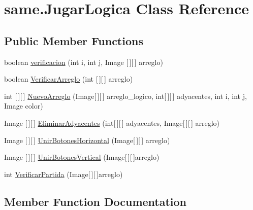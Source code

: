 \hypertarget{classsame_1_1_jugar_logica}{}\section{same.\+Jugar\+Logica Class Reference}
\label{classsame_1_1_jugar_logica}
\subsection*{Public Member Functions}
\begin{DoxyCompactItemize}
\item 
boolean \hyperlink{classsame_1_1_jugar_logica_a5ec9d7b6c4662fc93a69793ea85608d6}{verificacion} (int i, int j, Image \mbox{[}$\,$\mbox{]}\mbox{[}$\,$\mbox{]} arreglo)
\item 
boolean \hyperlink{classsame_1_1_jugar_logica_af70caf670071063ad7ac96d5a548b08b}{Verificar\+Arreglo} (int \mbox{[}$\,$\mbox{]}\mbox{[}$\,$\mbox{]} arreglo)
\item 
int \mbox{[}$\,$\mbox{]}\mbox{[}$\,$\mbox{]} \hyperlink{classsame_1_1_jugar_logica_a021d188f57a9559187059e053aa2b951}{Nuevo\+Arreglo} (Image\mbox{[}$\,$\mbox{]}\mbox{[}$\,$\mbox{]} arreglo\+\_\+logico, int\mbox{[}$\,$\mbox{]}\mbox{[}$\,$\mbox{]} adyacentes, int i, int j, Image color)
\item 
Image \mbox{[}$\,$\mbox{]}\mbox{[}$\,$\mbox{]} \hyperlink{classsame_1_1_jugar_logica_ab2800772a9d1be102afdec9f5b5dea1b}{Eliminar\+Adyacentes} (int\mbox{[}$\,$\mbox{]}\mbox{[}$\,$\mbox{]} adyacentes, Image\mbox{[}$\,$\mbox{]}\mbox{[}$\,$\mbox{]} arreglo)
\item 
Image \mbox{[}$\,$\mbox{]}\mbox{[}$\,$\mbox{]} \hyperlink{classsame_1_1_jugar_logica_a9cbb58eb8091d8eb851d6f962ba6f438}{Unir\+Botones\+Horizontal} (Image\mbox{[}$\,$\mbox{]}\mbox{[}$\,$\mbox{]} arreglo)
\item 
Image \mbox{[}$\,$\mbox{]}\mbox{[}$\,$\mbox{]} \hyperlink{classsame_1_1_jugar_logica_a6631389e8edd1025e58997ad3322091f}{Unir\+Botones\+Vertical} (Image\mbox{[}$\,$\mbox{]}\mbox{[}$\,$\mbox{]}arreglo)
\item 
int \hyperlink{classsame_1_1_jugar_logica_a24a1f8b23b9276240d46eebdfc3a88ba}{Verificar\+Partida} (Image\mbox{[}$\,$\mbox{]}\mbox{[}$\,$\mbox{]}arreglo)
\end{DoxyCompactItemize}


\subsection{Member Function Documentation}
\mbox{\label{classsame_1_1_jugar_logica_ab2800772a9d1be102afdec9f5b5dea1b}} 

